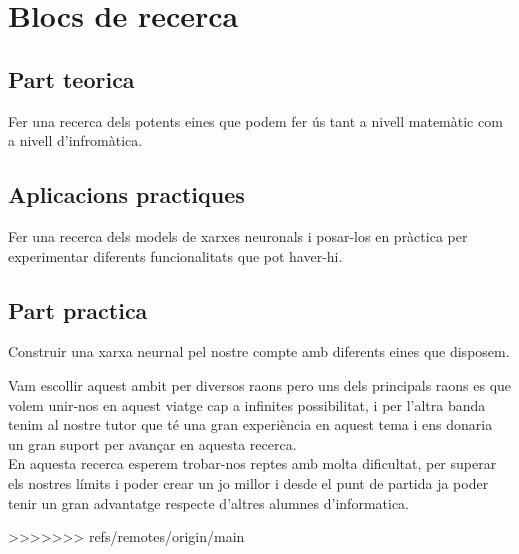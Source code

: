 \section{Blocs de recerca}
\subsection{Part teorica}
Fer una recerca dels potents eines que podem fer ús tant a nivell matemàtic com a nivell  d'infromàtica.
\subsection{Aplicacions practiques}
Fer una recerca dels models de xarxes neuronals i posar-los en pràctica per experimentar diferents funcionalitats que pot haver-hi.
\subsection{Part practica }
Construir una xarxa neurnal pel nostre compte amb diferents eines que disposem.

Vam escollir aquest ambit per diversos raons pero uns dels principals raons es que volem unir-nos en aquest viatge cap  a infinites possibilitat, i per l'altra banda tenim al nostre tutor que té una gran experiència en aquest tema i ens donaria un gran suport per avançar en aquesta recerca.\\
En aquesta recerca esperem trobar-nos reptes amb molta dificultat, per superar els nostres límits i poder crear un jo millor i desde el punt de partida ja poder tenir un gran advantatge respecte d'altres alumnes d'informatica.

















>>>>>>> refs/remotes/origin/main
